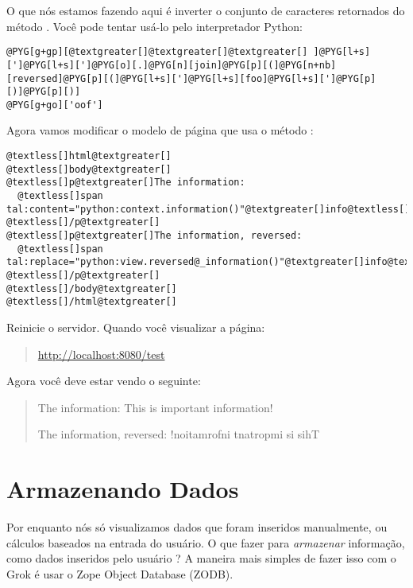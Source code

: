 \documentclass[a4paper,12pt,portuguese]{manual}
\begin{document}
O que nós estamos fazendo aqui é inverter o conjunto de caracteres
retornados do método  . Você pode tentar usá-lo pelo
interpretador Python:

\begin{Verbatim}[commandchars=@\[\]]
@PYG[g+gp][@textgreater[]@textgreater[]@textgreater[] ]@PYG[l+s][']@PYG[l+s][']@PYG[o][.]@PYG[n][join]@PYG[p][(]@PYG[n+nb][reversed]@PYG[p][(]@PYG[l+s][']@PYG[l+s][foo]@PYG[l+s][']@PYG[p][)]@PYG[p][)]
@PYG[g+go]['oof']
\end{Verbatim}

Agora vamos modificar o modelo de página  que usa o
método :

\begin{Verbatim}[commandchars=@\[\]]
@textless[]html@textgreater[]
@textless[]body@textgreater[]
@textless[]p@textgreater[]The information:
  @textless[]span tal:content="python:context.information()"@textgreater[]info@textless[]/span@textgreater[]
@textless[]/p@textgreater[]
@textless[]p@textgreater[]The information, reversed: 
  @textless[]span tal:replace="python:view.reversed@_information()"@textgreater[]info@textless[]/span@textgreater[]
@textless[]/p@textgreater[]
@textless[]/body@textgreater[]
@textless[]/html@textgreater[]
\end{Verbatim}

Reinicie o servidor. Quando você visualizar a página:
\begin{quote}

\href{http://localhost:8080/test}{http://localhost:8080/test}
\end{quote}

Agora você deve estar vendo o seguinte:
\begin{quote}

The information: This is important information!

The information, reversed: !noitamrofni tnatropmi si sihT
\end{quote}


\section{Armazenando Dados}

Por enquanto nós só visualizamos dados que foram inseridos
manualmente, ou cálculos baseados na entrada do usuário. O que fazer
para \emph{armazenar} informação, como dados inseridos pelo usuário ? A
maneira mais simples de fazer isso com o Grok é usar o Zope Object
Database (ZODB).
\end{document}
